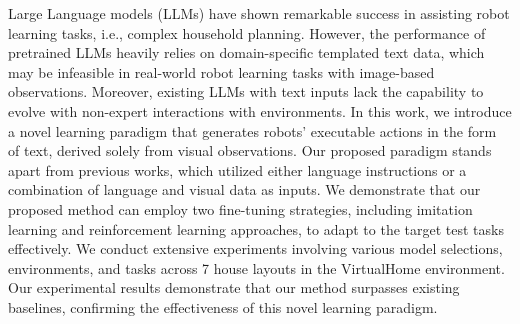 Large Language models (LLMs) have shown remarkable success in assisting robot learning tasks, i.e., complex household planning. However, the performance of pretrained LLMs heavily relies on domain-specific templated text data, which may be infeasible in real-world robot learning tasks with image-based observations.  Moreover, existing LLMs with text inputs lack the capability to evolve with non-expert interactions with environments. In this work, we introduce a novel learning paradigm that generates robots’ executable actions in the form of text, derived solely from visual observations. Our proposed paradigm stands apart from previous works, which utilized either language instructions or a combination of language and visual data as inputs.  We demonstrate that our proposed method can employ two fine-tuning strategies, including imitation learning and reinforcement learning approaches, to adapt to the target test tasks effectively. We conduct extensive experiments involving various model selections, environments, and tasks across 7 house layouts in the VirtualHome environment. Our experimental results demonstrate that our method surpasses existing baselines, confirming the effectiveness of this novel learning paradigm.